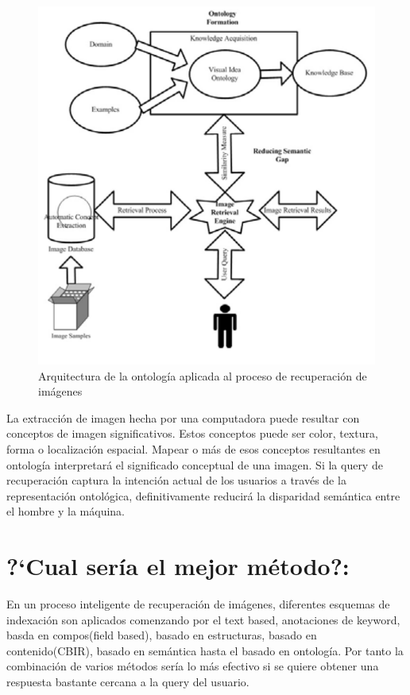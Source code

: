 \documentclass{llncs}
\begin{document}
\begin{figure}
    \caption{Arquitectura de la ontolog\'ia aplicada al proceso de recuperaci\'on de im\'agenes}
    \includegraphics[scale = .4]{./images/ontolgy-bases-image-retrieval-process.png}
\end{figure}

La extracci\'on de imagen hecha por una computadora puede resultar con conceptos de imagen 
significativos. Estos conceptos puede ser color, textura, forma o localizaci\'on espacial.
Mapear o m\'as de esos conceptos resultantes en ontolog\'ia interpretar\'a el significado 
conceptual de una imagen. Si la query de recuperaci\'on captura la intenci\'on actual de los
usuarios a trav\'es de la representaci\'on ontol\'ogica, definitivamente reducir\'a la disparidad 
sem\'antica entre el hombre y la m\'aquina.   

\noindent

\section*{?`Cual ser\'ia el mejor m\'etodo?:}
En un proceso inteligente de recuperaci\'on de im\'agenes, diferentes esquemas de indexaci\'on 
son aplicados comenzando por el text based, anotaciones de keyword, basda en compos(field based), 
basado en estructuras, basado en contenido(CBIR), basado en sem\'antica hasta el basado en ontolog\'ia.
Por tanto la combinaci\'on de varios m\'etodos ser\'ia lo m\'as efectivo si se quiere obtener una respuesta 
bastante cercana a la query del usuario.
\end{document}
